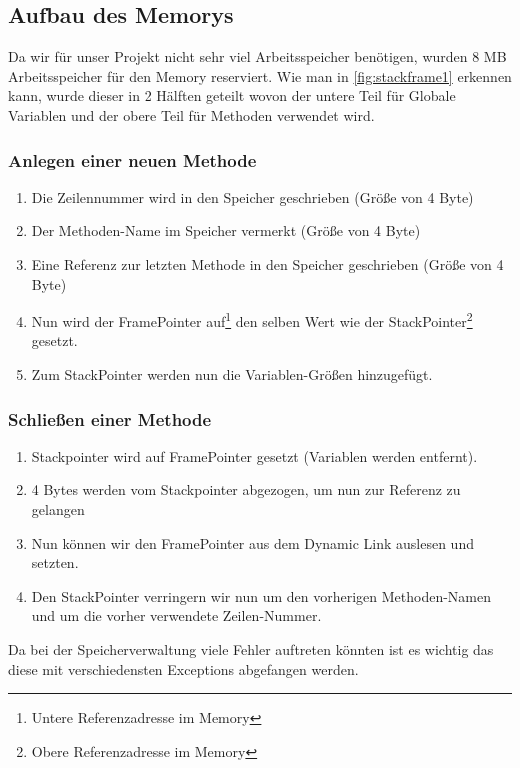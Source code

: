 \subsection{Aufbau des Memorys}
Da wir für unser Projekt nicht sehr viel Arbeitsspeicher benötigen, wurden 8 MB Arbeitsspeicher für den Memory reserviert.
Wie man in \ref{fig:stackframe1} erkennen kann, wurde dieser in 2 Hälften geteilt wovon der untere Teil für Globale Variablen und der obere Teil für Methoden verwendet wird.
\newpage

\subsubsection{Anlegen einer neuen Methode}
\begin{enumerate}
 \item Die Zeilennummer wird in den Speicher geschrieben (Größe von 4 Byte)
 \item Der Methoden-Name im Speicher vermerkt (Größe von 4 Byte)
 \item Eine Referenz zur letzten Methode in den Speicher geschrieben (Größe von 4 Byte)
 \item Nun wird der FramePointer auf\footnote{Untere Referenzadresse im Memory} den selben Wert wie der StackPointer\footnote{Obere Referenzadresse im Memory} gesetzt.
 \item Zum StackPointer werden nun die Variablen-Größen hinzugefügt.
\end{enumerate}
 
\subsubsection{Schließen einer Methode}
\begin{enumerate}
 \item Stackpointer wird auf FramePointer gesetzt (Variablen werden entfernt).
 \item 4 Bytes werden vom Stackpointer abgezogen, um nun zur Referenz zu gelangen
 \item Nun können wir den FramePointer aus dem Dynamic Link auslesen und setzten.
 \item Den StackPointer verringern wir nun um den vorherigen Methoden-Namen und um die vorher verwendete Zeilen-Nummer.
\end{enumerate}

Da bei der Speicherverwaltung viele Fehler auftreten könnten ist es wichtig das diese mit verschiedensten Exceptions abgefangen werden.

